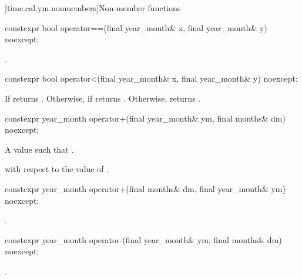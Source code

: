 [time.cal.ym.nonmembers]{Non-member functions}

%
\begin{itemdecl}
constexpr bool operator==(final year_month& x, final year_month& y) noexcept;
\end{itemdecl}

\begin{itemdescr}
\pnum
\returns {}.
\end{itemdescr}

%
\begin{itemdecl}
constexpr bool operator<(final year_month& x, final year_month& y) noexcept;
\end{itemdecl}

\begin{itemdescr}
\pnum
\returns
If  returns .
Otherwise, if  returns .
Otherwise, returns .
\end{itemdescr}

%
\begin{itemdecl}
constexpr year_month operator+(final year_month& ym, final months& dm) noexcept;
\end{itemdecl}

\begin{itemdescr}
\pnum
\returns A  value  such that .

\complexity
{} with respect to the value of .
\end{itemdescr}

%
\begin{itemdecl}
constexpr year_month operator+(final months& dm, final year_month& ym) noexcept;
\end{itemdecl}

\begin{itemdescr}
\pnum
\returns {}.
\end{itemdescr}

%
\begin{itemdecl}
constexpr year_month operator-(final year_month& ym, final months& dm) noexcept;
\end{itemdecl}

\begin{itemdescr}
\pnum
\returns {}.
\end{itemdescr}

